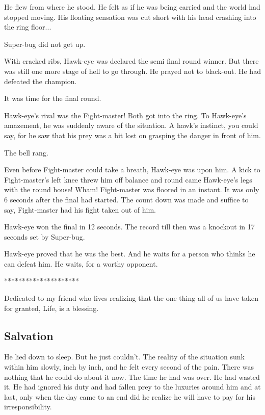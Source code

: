 \documentclass[twoside,11pt]{article}
\begin{document}
He flew from where he stood. He felt as if he was being carried and the world had stopped moving. His floating sensation was cut short with his head crashing into the ring floor...

Super-bug did not get up.

With cracked ribs, Hawk-eye was declared the semi final round winner. But there was still one more stage of hell to go through. He prayed not to black-out. He had defeated the champion.

It was time for the final round.

Hawk-eye's rival was the Fight-master! Both got into the ring. To Hawk-eye's amazement, he was suddenly aware of the situation. A hawk's instinct, you could say, for he saw that his prey was a bit lost on grasping the danger in front of him.

The bell rang.

Even before Fight-master could take a breath, Hawk-eye was upon him. A kick to Fight-master's left knee threw him off balance and round came Hawk-eye's legs with the round house! Wham! Fight-master was floored in an instant. It was only 6 seconds after the final had started. The count down was made and suffice to say, Fight-master had his fight taken out of him.

Hawk-eye won the final in 12 seconds. The record till then was a knockout in 17 seconds set by Super-bug.

Hawk-eye proved that he was the best. And he waits for a person who thinks he can defeat him. He waits, for a worthy opponent.

\bigskip
\begin{center}
*********************
\end{center}

Dedicated to my friend who lives realizing that the one thing all of us have taken for granted, Life, is a blessing.

\newpage

\begin{center}
  \section{Salvation}
\end{center}
\bigskip
\bigskip
\bigskip

He lied down to sleep. But he just couldn't. The reality of the situation sunk within him slowly, inch by inch, and he felt every second of the pain. There was nothing that he could do about it now. The time he had was over. He had wasted it. He had ignored his duty and had fallen prey to the luxuries around him and at last, only when the day came to an end did he realize he will have to pay for his irresponsibility.
\end{document}
